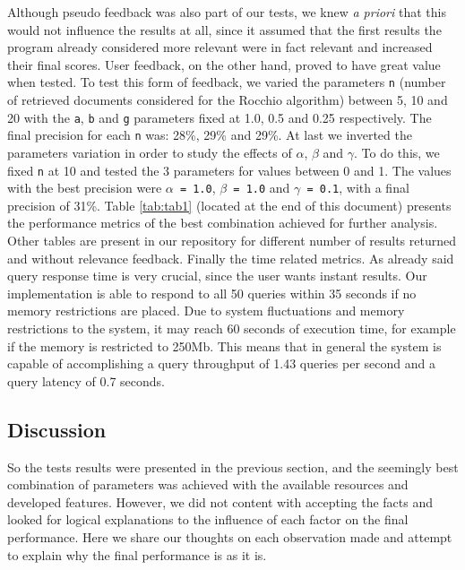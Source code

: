 \documentclass[12pt]{article}
\begin{document}
Although pseudo feedback was also part of our tests, we knew \textit{a priori} 
that this would not influence the results at all, since it assumed that the first
results the program already considered more relevant were in fact relevant and 
increased their final scores.
User feedback, on the other hand, proved to have great value when tested.
To test this form of feedback, we varied the parameters \texttt{n} (number of 
retrieved documents considered for the Rocchio algorithm) between 5, 10 and 20
with the \texttt{a}, \texttt{b} and \texttt{g} parameters fixed at 1.0, 0.5 and
0.25 respectively.
The final precision for each \texttt{n} was: 28\%, 29\% and 29\%. 
At last we inverted the parameters variation in order to study the effects of 
$\alpha$, $\beta$ and $\gamma$.
To do this, we fixed \texttt{n} at 10 and tested the 3 parameters for values
between 0 and 1.
The values with the best precision were \texttt{$\alpha$ = 1.0}, 
\texttt{$\beta$ = 1.0} and \texttt{$\gamma$ = 0.1}, with a final precision of 31\%.
Table \ref{tab:tab1} (located at the end of this document) presents the performance 
metrics of the best combination achieved for further analysis.
Other tables are present in our repository for different number of results returned 
and without relevance feedback.
Finally the time related metrics. 
As already said query response time is very crucial, since the user wants instant results.
Our implementation is able to respond to all 50 queries within 35 seconds if no 
memory restrictions are placed. 
Due to system fluctuations and memory restrictions to the system, it may reach 
60 seconds of execution time, for example if the memory is restricted to 250Mb.
This means that in general the system is capable of accomplishing a query 
throughput of 1.43 queries per second and a query latency of 0.7 seconds.

\subsection{Discussion}\label{discussion}

So the tests results were presented in the previous section, and the seemingly
best combination of parameters was achieved with the available resources and 
developed features.
However, we did not content with accepting the facts and looked for logical
explanations to the influence of each factor on the final performance.
Here we share our thoughts on each observation made and attempt to explain why
the final performance is as it is.
\end{document}
